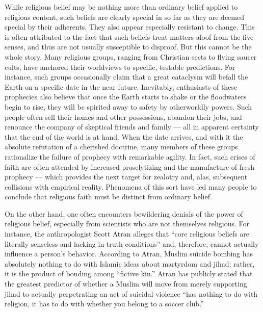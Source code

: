 \documentclass[a4paper,14pt]{extarticle}
\begin{document}
While religious belief may be nothing more than ordinary belief applied to religious content, such beliefs are clearly special in so far as they are deemed special by their adherents.
They also appear especially resistant to change.
This is often attributed to the fact that such beliefs treat matters aloof from the five senses, and thus are not usually susceptible to disproof.
But this cannot be the whole story.
Many religious groups, ranging from Christian sects to flying saucer cults, have anchored their worldviews to specific, testable predictions.
For instance, such groups occasionally claim that a great cataclysm will befall the Earth on a specific date in the near future.
Inevitably, enthusiasts of these prophecies also believe that once the Earth starts to shake or the floodwaters begin to rise, they will be spirited away to safety by otherworldly powers.
Such people often sell their homes and other possessions, abandon their jobs, and renounce the company of skeptical friends and family --- all in apparent certainty that the end of the world is at hand.
When the date arrives, and with it the absolute refutation of a cherished doctrine, many members of these groups rationalize the failure of prophecy with remarkable agility.
In fact, such crises of faith are often attended by increased proselytizing and the manufacture of fresh prophecy --- which provides the next target for zealotry and, alas, subsequent collisions with empirical reality.
Phenomena of this sort have led many people to conclude that religious faith must be distinct from ordinary belief.

On the other hand, one often encounters bewildering denials of the power of religious belief, especially from scientists who are not themselves religious.
For instance, the anthropologist Scott Atran alleges that ``core religious beliefs are literally senseless and lacking in truth conditions'' and, therefore, cannot actually influence a person’s behavior.
According to Atran, Muslim suicide bombing has absolutely nothing to do with Islamic ideas about martyrdom and jihad;
rather, it is the product of bonding among ``fictive kin.''
Atran has publicly stated that the greatest predictor of whether a Muslim will move from merely supporting jihad to actually perpetrating an act of suicidal violence ``has nothing to do with religion, it has to do with whether you belong to a soccer club.''
\end{document}
